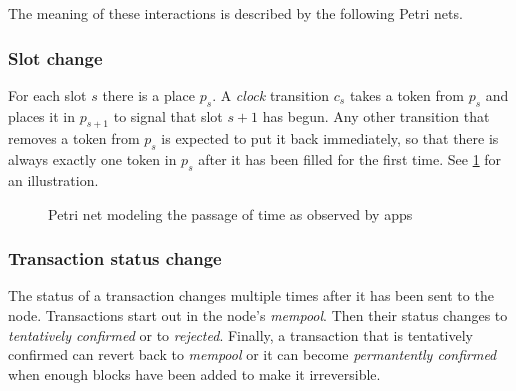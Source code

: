 The meaning of these interactions is described by the following Petri nets.

\subsubsection{Slot change}

For each slot $s$ there is a place $p_s$.
A \emph{clock} transition $c_s$ takes a token from $p_s$ and places it in $p_{s+1}$ to signal that slot $s + 1$ has begun.
Any other transition that removes a token from $p_s$ is expected to put it back immediately, so that there is always exactly one token in $p_s$ after it has been filled for the first time. See \ref{fig:petri-net-time} for an illustration.

\begin{figure}
  \centering
\caption{Petri net modeling the passage of time as observed by \glspl{app}}
\label{fig:petri-net-time}
\end{figure}

\subsubsection{Transaction status change}

The status of a transaction changes multiple times after it has been sent to the node.
Transactions start out in the node's \emph{mempool}.
Then their status changes to \emph{tentatively confirmed} or to \emph{rejected}.
Finally, a transaction that is tentatively confirmed can revert back to \emph{mempool} or it can become \emph{permantently confirmed} when enough blocks have been added to make it irreversible.

